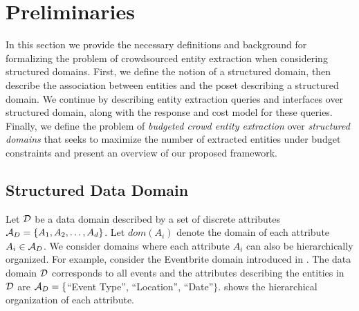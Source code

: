 
\section{Preliminaries}
\label{sec:prelims}
In this section we provide the necessary definitions and background for formalizing the problem of crowdsourced entity extraction when considering structured domains. First, we define the notion of a structured domain, then describe the association between entities and the poset describing a structured domain. We continue by describing 
entity extraction queries and interfaces over structured domain, along with the response and cost model for these queries. Finally, we define the problem of {\em budgeted crowd entity extraction} over {\em structured domains} that seeks to maximize the number of extracted entities under budget constraints and present an overview of our proposed framework.


\subsection{Structured Data Domain}
\label{sec:data-domain}

Let $\mathcal{D}$ be a data domain described by a set of discrete attributes $\mathcal{A}_D = \{A_1, A_2, \dots, A_d\}$. Let $dom(A_i)$ denote the domain of each attribute $A_i  \in \mathcal{A}_D$. We consider domains where each attribute $A_i$ can also be hierarchically organized. \iftr For example, consider the Eventbrite domain introduced in . The data domain $\mathcal{D}$ corresponds to all events and the attributes describing the entities in $\mathcal{D}$ are $\mathcal{A}_D = \{$``Event Type'', ``Location'', ``Date''$\}$.  shows the hierarchical organization of each attribute.

